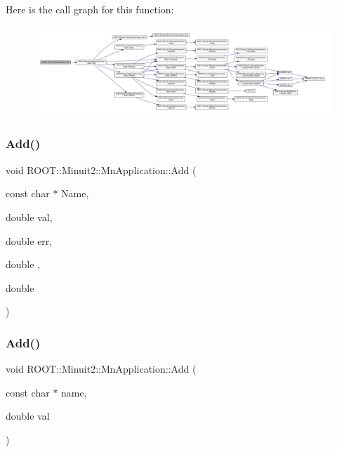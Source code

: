 Here is the call graph for this function\+:
\nopagebreak
\begin{figure}[H]
\begin{center}
\leavevmode
\includegraphics[width=350pt]{df/dd5/classROOT_1_1Minuit2_1_1MnApplication_afd0879fb1f21d49dd649698c1cd25e50_cgraph}
\end{center}
\end{figure}
\mbox{\label{classROOT_1_1Minuit2_1_1MnApplication_afd0879fb1f21d49dd649698c1cd25e50}} 
\subsubsection{\texorpdfstring{Add()}{Add()}\hspace{0.1cm}{\footnotesize\ttfamily [6/9]}}
{\footnotesize\ttfamily void R\+O\+O\+T\+::\+Minuit2\+::\+Mn\+Application\+::\+Add (\begin{DoxyParamCaption}\item[{const char $\ast$}]{Name,  }\item[{double}]{val,  }\item[{double}]{err,  }\item[{double}]{,  }\item[{double}]{ }\end{DoxyParamCaption})}

\mbox{\label{classROOT_1_1Minuit2_1_1MnApplication_a67220ef54f4862a27490162b2f7cf832}} 
\subsubsection{\texorpdfstring{Add()}{Add()}\hspace{0.1cm}{\footnotesize\ttfamily [7/9]}}
{\footnotesize\ttfamily void R\+O\+O\+T\+::\+Minuit2\+::\+Mn\+Application\+::\+Add (\begin{DoxyParamCaption}\item[{const char $\ast$}]{name,  }\item[{double}]{val }\end{DoxyParamCaption})}

